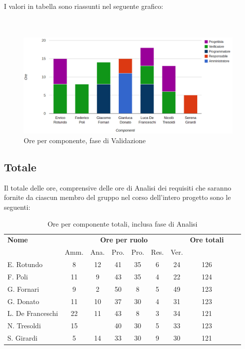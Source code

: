 I valori in tabella sono riassunti nel seguente grafico: \\ \\ \\

\begin{figure}[H]
\centering
\includegraphics[scale=0.35]{4-4.png}
\caption{Ore per componente, fase di Validazione\label{fig:nome}}
\end{figure}

\subsection{Totale}

Il totale delle ore, comprensive delle ore di Analisi dei requisiti che saranno fornite da ciascun membro del gruppo nel corso dell'intero progetto sono le seguenti:

\begin{table}[H]
\centering
\begin{tabular}{lccccccccc}
\toprule 
    \textbf{Nome}  & \multicolumn{6}{c}{\textbf{Ore per ruolo}} & \textbf{Ore totali}\\
    & Amm. & Ana. & Pro. & Pro. & Res. & Ver. \\
    \midrule
    E. Rotundo   	& 8 & 12& 41 & 35 & 6 & 24 & 126 \\
    F. Poli  		& 11	& 9 & 43 & 35 & 4 & 22 & 124 \\
    G. Fornari		& 9	& 2 & 50 & 8  & 5 & 49 & 123 \\
    G. Donato 		& 11	& 10& 37 & 30 & 4 & 31 & 123 \\
    L. De Franceschi 	& 22	& 11& 43 & 8  & 3 & 34 & 121 \\
    N. Tresoldi 		& 15	&   & 40 & 30 & 5 & 33 & 123 \\
    S. Girardi 		& 5	& 14& 33 & 30 & 9 & 30 & 121 \\
    
    \bottomrule
\end{tabular}
\caption{Ore per componente totali, inclusa fase di Analisi}
\end{table}

